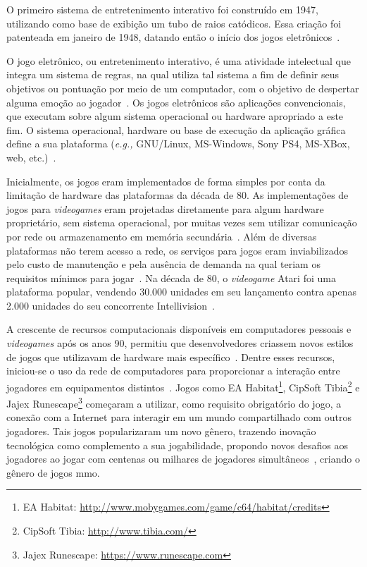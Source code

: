 O primeiro sistema de entretenimento interativo foi construído em 1947, utilizando como base de exibição um tubo de raios catódicos.
%
Essa criação foi patenteada em janeiro de 1948, datando então o início dos jogos eletrônicos~\cite{Adams2014Jan, patents1947Jan}.



O jogo eletrônico, ou entretenimento interativo, é uma atividade intelectual que integra um sistema de regras, na qual utiliza tal sistema a fim de definir seus objetivos ou pontuação por meio de um computador, com o objetivo de despertar alguma emoção ao jogador~\cite{video_game_technologies}.
%
Os jogos eletrônicos são aplicações convencionais, que executam sobre algum sistema operacional ou hardware apropriado a este fim.
%
O sistema operacional, hardware ou base de execução da aplicação gráfica define a sua plataforma (\textit{e.g.,} GNU/Linux, MS-Windows, Sony PS4, MS-XBox, web, etc.)~\cite{adams_1208533}.



Inicialmente, os jogos eram implementados de forma simples por conta da limitação de hardware das plataformas da década de 80.
%
As implementações de jogos para \textit{videogames} eram projetadas diretamente para algum hardware proprietário, sem sistema operacional, por muitas vezes sem utilizar comunicação por rede ou armazenamento em memória secundária~\cite{rollings2003andrew}.
%
Além de diversas plataformas não terem acesso a rede, os serviços para jogos eram inviabilizados pelo custo de manutenção e pela ausência de demanda na qual teriam os requisitos mínimos para jogar~\cite{adams_1208533}.
%
Na década de 80, o \textit{videogame} Atari foi uma plataforma popular, vendendo 30.000 unidades em seu lançamento contra apenas 2.000 unidades do seu concorrente Intellivision~\cite{atari_age}.



A crescente de recursos computacionais disponíveis em computadores pessoais e \textit{videogames} após os anos 90, permitiu que desenvolvedores criassem novos estilos de jogos que utilizavam de hardware mais específico~\cite{adams_1208533}.
%
Dentre esses recursos, iniciou-se o uso da rede de computadores para proporcionar a interação entre jogadores em equipamentos distintos~\cite{statisita_consumo_rede}.
%
Jogos como EA Habitat\footnote{EA Habitat: \url{http://www.mobygames.com/game/c64/habitat/credits}}, CipSoft Tibia\footnote{CipSoft Tibia: \url{http://www.tibia.com/}} e Jajex Runescape\footnote{Jajex Runescape: \url{https://www.runescape.com}} começaram a utilizar, como requisito obrigatório do jogo, a conexão com a Internet para interagir em um mundo compartilhado com outros jogadores.
%
Tais jogos popularizaram um novo gênero, trazendo inovação tecnológica como complemento a sua jogabilidade, propondo novos desafios aos jogadores ao jogar com centenas ou milhares de jogadores simultâneos~\cite{guinness_runescape, 1417630}, criando o gênero de jogos \ac{mmo}.

